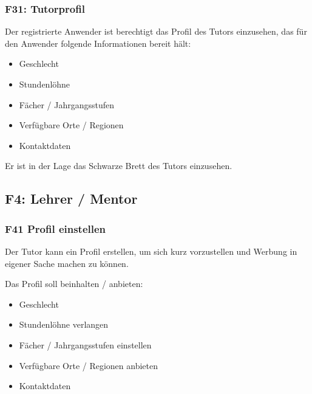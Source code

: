 \documentclass[10pt,a4paper]{scrartcl}
\begin{document}
%

\subsubsection*{F31: Tutorprofil}

Der registrierte Anwender ist berechtigt das Profil des Tutors einzusehen, das für den Anwender folgende Informationen bereit hält:

\begin{itemize}
	\item Geschlecht
	\item Stundenlöhne
	\item Fächer / Jahrgangsstufen
	\item Verfügbare Orte / Regionen
	\item Kontaktdaten
\end{itemize}

Er ist in der Lage das Schwarze Brett des Tutors einzusehen.


\subsection{F4: Lehrer / Mentor}
\subsubsection*{F41 Profil einstellen}
Der Tutor kann ein Profil erstellen, um sich kurz vorzustellen und Werbung in eigener Sache machen zu können.

Das Profil soll beinhalten / anbieten:
\begin{itemize}
	\item Geschlecht
	\item Stundenlöhne verlangen
	\item Fächer / Jahrgangsstufen einstellen
	\item Verfügbare Orte / Regionen anbieten
	\item Kontaktdaten
\end{itemize}
\end{document}
